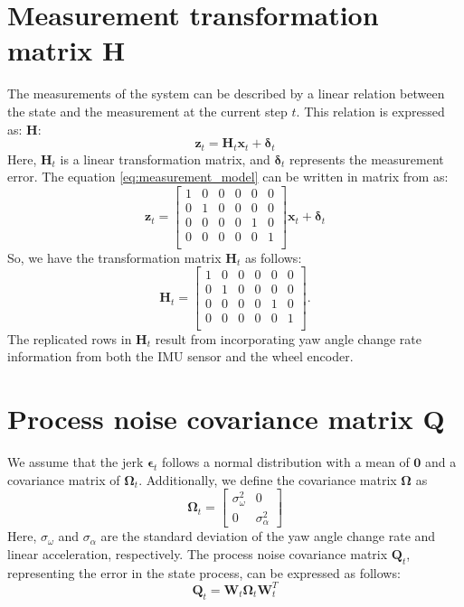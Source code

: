 \documentclass[12pt, a4paper]{article}
\begin{document}
\section{Measurement transformation matrix $\bm{H}$}
The measurements of the system can be described by a linear relation between the state and the measurement at the current step $t$. This relation is expressed as:
$\bm{H}$:
\begin{equation}
  \label{eq:measurement_model}
  \bm{z}_{t} = \bm{H}_{t}\bm{x}_{t} + \bm{\delta}_{t}
\end{equation}
Here, $\bm{H}_{t}$ is a linear transformation matrix, and $\bm{\delta}_{t}$ represents the measurement error. The equation \eqref{eq:measurement_model} can be written in matrix from as:
\[
  \bm{z}_{t} = \begin{bmatrix}
    1 & 0 & 0 & 0 & 0 & 0\\
    0 & 1 & 0 & 0 & 0 & 0\\
    0 & 0 & 0 & 0 & 1 & 0\\
    0 & 0 & 0 & 0 & 0 & 1\\
  \end{bmatrix}\bm{x}_{t}+\bm{\delta}_{t}
\]
So, we have the transformation matrix $\bm{H}_{t}$ as follows:
\[
  \bm{H}_{t} = \begin{bmatrix}
    1 & 0 & 0 & 0 & 0 & 0\\
    0 & 1 & 0 & 0 & 0 & 0\\
    0 & 0 & 0 & 0 & 1 & 0\\
    0 & 0 & 0 & 0 & 0 & 1\\
  \end{bmatrix}.
\]
The replicated rows in $\bm{H}_{t}$ result from incorporating yaw angle change rate information from both the IMU sensor and the wheel encoder.

\section{Process noise covariance matrix $\bm{Q}$}
\label{sec:process_noise}
We assume that the jerk $\bm{\epsilon}_{t}$ follows a normal distribution with a mean of $\bm{0}$ and a covariance matrix of $\bm{\Omega}_{t}$. Additionally, we define the covariance matrix $\bm{\Omega}$ as
\[
  \bm{\Omega}_{t}=\begin{bmatrix}
    \sigma_{\omega}^{2} & 0\\
    0 & \sigma_{\alpha}^{2}
  \end{bmatrix}
\]
Here, $\sigma_{\omega}$ and $\sigma_{\alpha}$ are the standard deviation of the yaw angle change rate and linear acceleration, respectively. The process noise covariance matrix $\bm{Q}_{t}$, representing the error in the state process, can be expressed as follows:
\[
  \bm{Q}_{t} = \bm{W}_{t}\bm{\Omega}_{t}\bm{W}_{t}^{T}
\]
\end{document}
